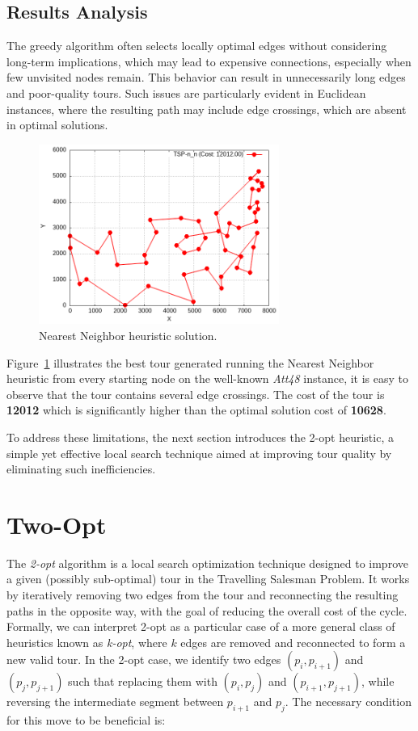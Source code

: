 \subsection{Results Analysis}
\label{sec:nn-analysis}
The greedy algorithm often selects locally optimal edges without considering long-term implications, which may lead to expensive connections, 
especially when few unvisited nodes remain. This behavior can result in unnecessarily long edges and poor-quality tours. Such issues are particularly 
evident in Euclidean instances, where the resulting path may include edge crossings, which are absent in optimal solutions.

\begin{figure}[h!]
    \centering
    \includegraphics[width=0.7\textwidth]{images/TSP_n_n.png}
    \caption{Nearest Neighbor heuristic solution.}
    \label{fig:nn-example}
\end{figure}

Figure~\ref{fig:nn-example} illustrates the best tour generated running the Nearest Neighbor heuristic from every starting node on the well-known \textit{Att48} instance, it is easy to observe that the tour contains several edge crossings. The cost of the tour is \textbf{12012} which is significantly higher than the optimal solution cost of \textbf{10628}.

To address these limitations, the next section introduces the 2-opt heuristic, a simple yet effective local search technique aimed at improving tour quality by eliminating such inefficiencies.

\section{Two-Opt}

The \textit{2-opt} algorithm is a local search optimization technique designed to improve a given (possibly sub-optimal) tour 
in the Travelling Salesman Problem. It works by iteratively removing two edges from the tour and reconnecting the resulting paths 
in the opposite way, with the goal of reducing the overall cost of the cycle.
Formally, we can interpret 2-opt as a particular case of a more general class of heuristics known as \textit{k-opt}, 
where $k$ edges are removed and reconnected to form a new valid tour. In the 2-opt case, we identify two edges $(p_i, p_{i+1})$ 
and $(p_j, p_{j+1})$ such that replacing them with $(p_i, p_j)$ and $(p_{i+1}, p_{j+1})$, while reversing the intermediate segment between $p_{i+1}$ and $p_j$. 
The necessary condition for this move to be beneficial is:

